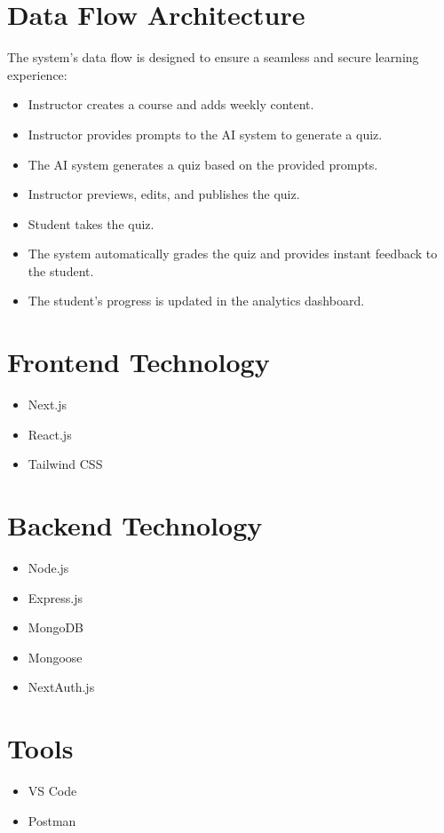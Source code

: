\documentclass{thesis-library}
\begin{document}
\section{Data Flow Architecture}
The system's data flow is designed to ensure a seamless and secure learning experience:
\begin{itemize}
\item Instructor creates a course and adds weekly content.
\item Instructor provides prompts to the AI system to generate a quiz.
\item The AI system generates a quiz based on the provided prompts.
\item Instructor previews, edits, and publishes the quiz.
\item Student takes the quiz.
\item The system automatically grades the quiz and provides instant feedback to the student.
\item The student's progress is updated in the analytics dashboard.
\end{itemize}

\section{Frontend Technology}
\begin{itemize}
\item Next.js
\item React.js
\item Tailwind CSS
\end{itemize}

\section{Backend Technology}
\begin{itemize}
\item Node.js
\item Express.js
\item MongoDB
\item Mongoose
\item NextAuth.js
\end{itemize}

\section{Tools}
\begin{itemize}
\item VS Code
\item Postman
\end{itemize}
\end{document}
